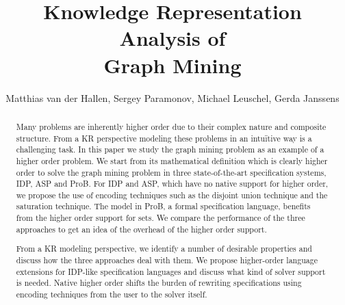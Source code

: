 \documentclass{new_tlp}
\author[]{Matthias van der Hallen, Sergey Paramonov, Michael Leuschel, Gerda Janssens}
\title{Knowledge Representation Analysis of\\ Graph Mining}
\begin{document}
\maketitle
\begin{abstract}
Many problems are inherently higher order due to their complex nature and composite structure.
From a KR perspective modeling these problems in an intu\"itive way is a challenging task.
In this paper we study the graph mining problem as an example of a higher order problem.
We start from its mathematical definition which is clearly higher
order to solve the graph mining problem in three state-of-the-art specification
systems, IDP, ASP and ProB.
For IDP and ASP, which have no
native support for higher order, we propose the use of encoding
techniques such as the disjoint union technique and the saturation technique.
The model in ProB, a formal specification language, benefits
from the higher order support for sets.
We compare the performance of the three approaches to get an idea of
the overhead of the higher order support.

From a KR modeling perspective, we identify a number of desirable
properties and discuss how the three approaches deal with them.
We propose higher-order language extensions for IDP-like
specification languages
and  discuss what kind of solver support is needed.
Native higher order shifts the burden of rewriting specifications using encoding techniques from the user to the solver itself.


\end{abstract}


%




%


{\tiny
}



\end{document}
